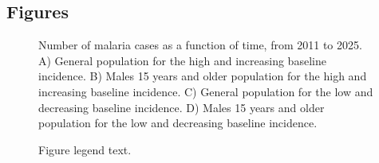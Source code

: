 \documentclass[doublespacing]{bmcart}
\begin{document}
\begin{backmatter}


\section*{Figures}
  \begin{figure}[h!]
  \caption{
      Number of malaria cases as a function of time, from 2011 to 2025. A) General population for the high and increasing baseline incidence. B) Males 15 years and older population for the high and increasing baseline incidence. C) General population for the low and decreasing baseline incidence. D) Males 15 years and older population for the low and decreasing baseline incidence. }
      \end{figure}

\begin{figure}[h!]
  \caption{
      Figure legend text.}
      \end{figure}



\end{backmatter}
\end{document}
